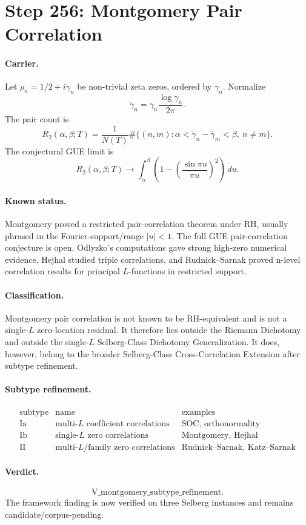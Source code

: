 \section*{Step 256: Montgomery Pair Correlation}

\paragraph{Carrier.}
Let \(\rho_n=1/2+i\gamma_n\) be non-trivial zeta zeros, ordered by
\(\gamma_n\).  Normalize
\[
\widetilde\gamma_n=\gamma_n\frac{\log\gamma_n}{2\pi}.
\]
The pair count is
\[
R_2(\alpha,\beta;T)
=\frac{1}{N(T)}
\#\{(n,m):\alpha<\widetilde\gamma_n-\widetilde\gamma_m<\beta,\ n\ne m\}.
\]
The conjectural GUE limit is
\[
R_2(\alpha,\beta;T)\to
\int_\alpha^\beta
\left(1-\left(\frac{\sin\pi u}{\pi u}\right)^2\right)\,du.
\]

\paragraph{Known status.}
Montgomery proved a restricted pair-correlation theorem under RH, usually
phrased in the Fourier-support/range \(|u|<1\).  The full GUE pair-correlation
conjecture is open.  Odlyzko's computations gave strong high-zero numerical
evidence.  Hejhal studied triple correlations, and Rudnick--Sarnak proved
n-level correlation results for principal \(L\)-functions in restricted
support.

\paragraph{Classification.}
Montgomery pair correlation is not known to be RH-equivalent and is not a
single-\(L\) zero-location residual.  It therefore lies outside the Riemann
Dichotomy and outside the single-\(L\) Selberg-Class Dichotomy Generalization.
It does, however, belong to the broader Selberg-Class Cross-Correlation
Extension after subtype refinement.

\paragraph{Subtype refinement.}
\[
\begin{array}{c|c|c}
\text{subtype} & \text{name} & \text{examples}\\
\hline
\text{Ia} & \text{multi-}L\text{ coefficient correlations} & \text{SOC, orthonormality}\\
\text{Ib} & \text{single-}L\text{ zero correlations} & \text{Montgomery, Hejhal}\\
\text{II} & \text{multi-}L\text{/family zero correlations} & \text{Rudnick--Sarnak, Katz--Sarnak}
\end{array}
\]

\paragraph{Verdict.}
\[
\mathrm{V\_montgomery\_subtype\_refinement}.
\]
The framework finding is now verified on three Selberg instances and remains
candidate/corpus-pending.
